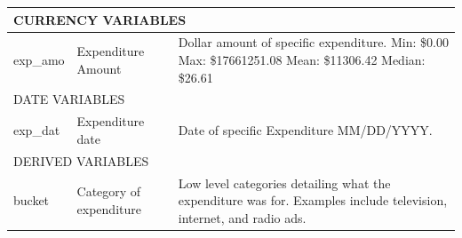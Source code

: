 \documentclass[11pt]{article}\usepackage{graphicx, color}
\begin{document}
\begin{table}[h!]
\begin{tabular}[\textwidth]{l l p{}}
\hline
\multicolumn{3}{l}{\MakeTextUppercase{Currency Variables}}\\
\hline
exp\_amo & Expenditure Amount & Dollar amount of specific expenditure. \newline 
Min: \$0.00 \newline
Max: \$17661251.08 \newline
Mean: \$11306.42 \newline
Median: \$26.61\\
\hline
\multicolumn{3}{l}{\MakeTextUppercase{Date Variables}}\\
\hline
exp\_dat &  Expenditure date & Date of specific Expenditure	MM/DD/YYYY.\\
\hline
\multicolumn{3}{l}{\MakeTextUppercase{Derived Variables}}\\
\hline
bucket & Category of expenditure & Low level categories detailing what the expenditure was for. Examples include television, internet, and radio ads.\\

\end{tabular}
\end{table}
\end{document}
